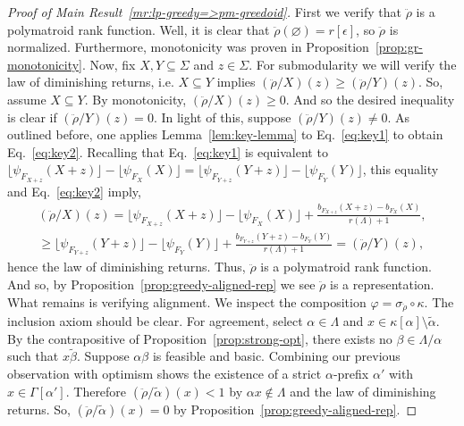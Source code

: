 \documentclass[11pt]{article}
\newcommand{\univ}{\Sigma}
\newcommand{\glang}{\Lambda}
\newcommand{\greedyrep}{\ddot{\rho}}
\begin{document}
\begin{proof}[Proof of Main Result~\ref{mr:lp-greedy=>pm-greedoid}]
    First we verify that $\greedyrep$ is a polymatroid rank function.
    Well, it is clear that $\greedyrep(\varnothing) = r[\epsilon]$, so $\greedyrep$ is normalized.
    Furthermore, monotonicity was proven in Proposition~\ref{prop:gr-monotonicity}.
    Now, fix $X,Y\subseteq \univ$ and $z \in\univ$.
    For submodularity we will verify the law of diminishing returns, i.e. $X\subseteq Y$ implies $\left(\greedyrep/X\right)(z)\geq \left(\greedyrep/Y\right)(z)$.
    So, assume $X\subseteq Y$.
    By monotonicity, $\left(\greedyrep/X\right)(z) \geq 0$.
    And so the desired inequality is clear if $\left(\greedyrep/Y\right)(z) = 0$.
    In light of this, suppose $\left(\greedyrep/Y\right)(z) \neq 0$.
    As outlined before, one applies Lemma~\ref{lem:key-lemma} to Eq.~\ref{eq:key1} to obtain Eq.~\ref{eq:key2}.
    Recalling that Eq.~\ref{eq:key1} is equivalent to $\lfloor\psi_{F_{X+z}}(X+z)\rfloor -\lfloor \psi_{F_X}(X)\rfloor = \lfloor\psi_{F_{Y+z}}(Y+z)\rfloor -\lfloor \psi_{F_Y}(Y)\rfloor$, this equality and Eq.~\ref{eq:key2} imply,
    \begin{multline*}
            \left(\greedyrep/X\right)(z) = \lfloor\psi_{F_{X+z}}(X+z)\rfloor -\lfloor \psi_{F_X}(X)\rfloor + \frac{b_{F_{X+z}}(X+z) -  b_{F_X}(X)}{r(\glang)+1},\\
                                         \geq \lfloor\psi_{F_{Y+z}}(Y+z)\rfloor -\lfloor \psi_{F_Y}(Y)\rfloor + \frac{b_{F_{Y+z}}(Y+z) -  b_{F_Y}(Y)}{r(\glang)+1} = \left(\greedyrep/Y\right)(z),
    \end{multline*}
    hence the law of diminishing returns.
    Thus, $\greedyrep$ is a polymatroid rank function.
    And so, by Proposition~\ref{prop:greedy-aligned-rep} we see $\greedyrep$ is a representation.
    What remains is verifying alignment.
    We inspect the composition $\varphi = \sigma_{\greedyrep}\circ\kappa$.
    The inclusion axiom should be clear.
    For agreement, select $\alpha \in \glang$ and $x \in \kappa[\alpha]\setminus\widetilde{\alpha}$.
    By the contrapositive of Proposition~\ref{prop:strong-opt}, there exists no $\beta \in \glang/\alpha$ such that $x \widetilde{\beta}$.
    Suppose $\alpha\beta$ is feasible and basic.
    Combining our previous observation with optimism shows the existence of a strict $\alpha$-prefix $\alpha'$ with $x \in \Gamma[\alpha']$.
    Therefore $(\greedyrep/\widetilde{\alpha})(x) < 1$ by $\alpha x \notin \glang$ and the law of diminishing returns.
    So, $(\greedyrep/\widetilde{\alpha})(x) = 0$ by Proposition~\ref{prop:greedy-aligned-rep}.

\end{proof}
\end{document}
